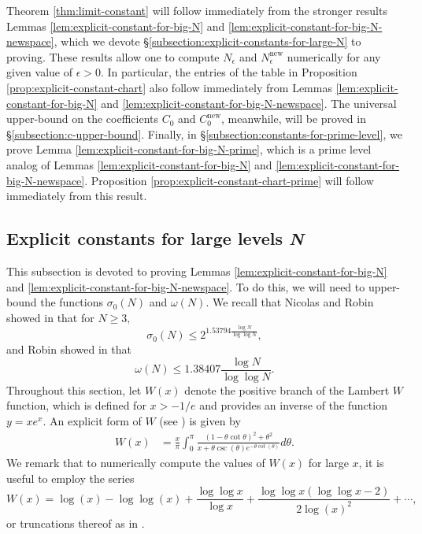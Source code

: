 \documentclass[11pt,letterpaper,reqno]{amsart}
\theoremstyle{definition}
\numberwithin{equation}{section}
\numberwithin{figure}{section}
\numberwithin{table}{section}
\let\subsectiontemp\subsection
\renewcommand{\subsection}[1]{ 
    \subsectiontemp{#1} \hfill\vspace{0.5\linespacing} 
}
\newcommand{\nw}{\mathrm{new}}
\begin{document}
Theorem \ref{thm:limit-constant} will follow immediately from the stronger results Lemmas \ref{lem:explicit-constant-for-big-N} and \ref{lem:explicit-constant-for-big-N-newspace}, which we devote \S \ref{subsection:explicit-constants-for-large-N} to proving. These results allow one to compute $N_\epsilon$ and $N_{\epsilon}^\nw$ numerically for any given value of $\epsilon > 0$. In particular, the entries of the table in Proposition \ref{prop:explicit-constant-chart} also follow immediately from Lemmas \ref{lem:explicit-constant-for-big-N} and \ref{lem:explicit-constant-for-big-N-newspace}. The universal upper-bound on the coefficients $C_0$ and $C_0^\nw$, meanwhile, will be proved in \S \ref{subsection:c-upper-bound}. Finally, in \S \ref{subsection:constants-for-prime-level}, we prove Lemma \ref{lem:explicit-constant-for-big-N-prime}, which is a prime level analog of Lemmas \ref{lem:explicit-constant-for-big-N} and \ref{lem:explicit-constant-for-big-N-newspace}. Proposition \ref{prop:explicit-constant-chart-prime} will follow immediately from this result. 

\subsection{Explicit constants for large levels \textit{N}}\label{subsection:explicit-constants-for-large-N}

This subsection is devoted to proving Lemmas \ref{lem:explicit-constant-for-big-N} and \ref{lem:explicit-constant-for-big-N-newspace}. To do this, we will need to upper-bound the functions $\sigma_0(N)$ and $\omega(N).$ We recall that
Nicolas and Robin showed in \cite[Th\'eor\`eme 1]{NR83} that for $N \geq 3,$
    \begin{equation}
        \sigma_0(N) \leq 2^{1.53794\frac{ \log N}{\log \log N}}, \label{eqn:Nicolas-Robin-bound}
    \end{equation}
    and Robin showed in \cite[Th\'eor\`eme 11]{Rob83} that
    \begin{equation}
        \omega(N) \leq 1.38407\frac{\log N}{\log \log N}. \label{eqn:Robin-bound}
    \end{equation}
Throughout this section, let $W(x)$ denote the positive branch of the Lambert $W$ function, which is defined for $x > -1/e$ and provides an inverse of the function $y = xe^x.$ An explicit form of $W$ (see \cite[Theorem 3.1]{kalugin2012stieltjes}) is given by
\begin{align}
    W(x) &= \frac{x}{\pi} \int_0^\pi \frac{(1 - \theta \cot \theta)^2 + \theta^2}{x + \theta \csc(\theta) e^{-\theta \cot (\theta)}} d \theta.
\end{align}
We remark that to numerically compute the values of $W(x)$ for large $x$, it is useful to employ the series
$$W(x) = \log(x) - \log \log (x) + \frac{\log \log x}{\log x} + \frac{\log \log x \left( \log \log x - 2  \right)}{2 \log(x)^2} + \cdots,
$$
or truncations thereof as in \cite[(4.19)]{corless1996lambertw}.
\end{document}

